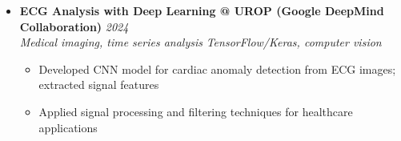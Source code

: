 \documentclass[a4paper,11pt]{article}
\begin{document}
\begin{itemize}[leftmargin=*, label={-}]
\item \textbf{ECG Analysis with Deep Learning @ UROP (Google DeepMind Collaboration)} \hfill \textit{2024} \\
\textit{Medical imaging, time series analysis} \hfill \textit{TensorFlow/Keras, computer vision}
\vspace{-2pt}
    \begin{itemize}[leftmargin=0.4cm, nosep, label=\tiny$\bullet$]
        \item \small{Developed CNN model for cardiac anomaly detection from ECG images; extracted signal features}
        \item \small{Applied signal processing and filtering techniques for healthcare applications}
    \end{itemize}
\vspace{3pt}

\end{itemize}
\end{document}
